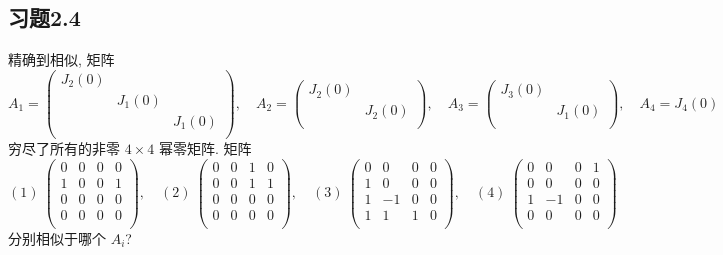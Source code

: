 \documentclass[color=black,device=normal,lang=cn,mode=geye]{elegantnote}
\begin{document}
\subsection{习题2.4}
\begin{exercise}%
    精确到相似, 矩阵
    \[A_1=\begin{pmatrix}
        J_2(0) \\
        & J_1(0) \\
        && J_1(0) \\
    \end{pmatrix},\quad A_2=\begin{pmatrix}
        J_2(0) \\
        & J_2(0) \\
    \end{pmatrix},\quad A_3=\begin{pmatrix}
        J_3(0) \\
        & J_1(0) \\
    \end{pmatrix},\quad A_4=J_4(0)\]
    穷尽了所有的非零 $4\times 4$ 幂零矩阵. 矩阵
    \[(1)\ \begin{pmatrix}
        0 & 0 & 0 & 0 \\
        1 & 0 & 0 & 1 \\
        0 & 0 & 0 & 0 \\
        0 & 0 & 0 & 0 \\
    \end{pmatrix},\quad(2)\ \begin{pmatrix}
        0 & 0 & 1 & 0 \\
        0 & 0 & 1 & 1 \\
        0 & 0 & 0 & 0 \\
        0 & 0 & 0 & 0 \\
    \end{pmatrix},\quad(3)\ \begin{pmatrix}
        0 & 0 & 0 & 0 \\
        1 & 0 & 0 & 0 \\
        1 & -1 & 0 & 0 \\
        1 & 1 & 1 & 0 \\
    \end{pmatrix},\quad(4)\ \begin{pmatrix}
        0 & 0 & 0 & 1 \\
        0 & 0 & 0 & 0 \\
        1 & -1 & 0 & 0 \\
        0 & 0 & 0 & 0 \\
    \end{pmatrix}\]
    分别相似于哪个 $A_i$?
\end{exercise}
\end{document}
